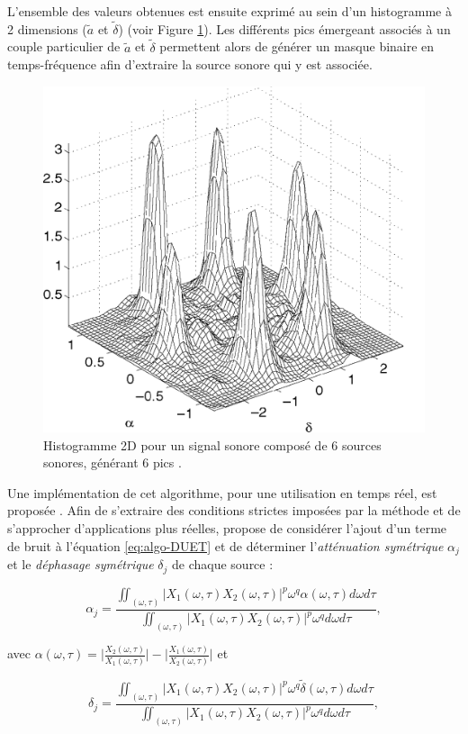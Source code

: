 L'ensemble des valeurs obtenues est ensuite exprimé au sein d'un histogramme à 2 dimensions ($\tilde{a}$ et $\tilde{\delta}$) (voir Figure \ref{fig:DUET_hist}).
Les différents pics émergeant associés à un couple particulier de $\tilde{a}$ et $\tilde{\delta}$ permettent alors de générer un masque binaire en temps-fréquence afin d'extraire la source sonore qui y est associée.

\begin{figure}[t]
\centering
\includegraphics[width = 0.6\linewidth]{./figures/autres/DUET_histogram.png}
\caption{Histogramme 2D pour un signal sonore composé de 6 sources sonores, générant 6 pics \cite{yilmaz2004blind}.}
\label{fig:DUET_hist}
\end{figure}

Une implémentation de cet algorithme, pour une utilisation en temps réel, est proposée \cite{rickard2001real}.
Afin de s'extraire des conditions strictes imposées par la méthode et de s'approcher d'applications plus réelles, \cite{rickard2007duet} propose de considérer l'ajout d'un terme de bruit à l'équation \ref{eq:algo-DUET} et de déterminer l'\textit{atténuation symétrique} $\alpha_j$ et le \textit{déphasage symétrique} $\delta_j$ de chaque source :

\begin{equation}
\alpha_j = \frac{\iint_{(\omega,\tau)} \vert X_1(\omega,\tau) X_2(\omega,\tau)\vert ^p \omega^q \alpha(\omega,\tau) d\omega d\tau}{\iint_{(\omega,\tau)}\vert X_1(\omega,\tau) X_2(\omega,\tau)\vert ^p \omega^q d\omega d\tau},
\end{equation}

avec $\alpha(\omega,\tau) = \bigg\vert \frac{X_2(\omega,\tau)}{X_1(\omega,\tau)} \bigg\vert - \bigg\vert  \frac{X_1(\omega,\tau)}{X_2(\omega,\tau)} \bigg\vert$ et

\begin{equation}
\delta_j = \frac{\iint_{(\omega,\tau)} \vert X_1(\omega,\tau) X_2(\omega,\tau)\vert ^p \omega^q \tilde{\delta}(\omega,\tau) d\omega d\tau}{\iint_{(\omega,\tau)}\vert X_1(\omega,\tau) X_2(\omega,\tau)\vert ^p \omega^q d\omega d\tau},
\end{equation}

